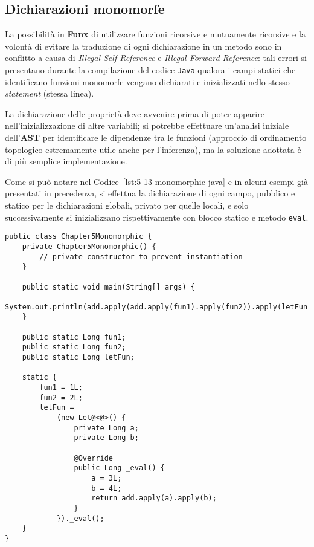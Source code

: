 \subsection{Dichiarazioni monomorfe}
\label{sec:5-13-monomorphic-declarations}

La possibilità in \textbf{Funx} di utilizzare funzioni ricorsive e mutuamente ricorsive
e la volontà di evitare la traduzione di ogni dichiarazione in un metodo sono in conflitto
a causa di \textit{Illegal Self Reference} e \textit{Illegal Forward Reference}:
tali errori si presentano durante la compilazione del codice \texttt{Java}
qualora i campi statici che identificano funzioni monomorfe vengano dichiarati e inizializzati
nello stesso \textit{statement} (stessa linea).


La dichiarazione delle proprietà deve avvenire prima di poter apparire nell'inizializzazione di altre variabili;
si potrebbe effettuare un'analisi iniziale dell'\textbf{AST} per identificare le dipendenze tra le funzioni
(approccio di ordinamento topologico estremamente utile anche per l'inferenza), ma la soluzione adottata
è di più semplice implementazione.


Come si può notare nel Codice~\ref{lst:5-13-monomorphic-java} e in alcuni esempi già presentati in precedenza,
si effettua la dichiarazione di ogni campo, pubblico e statico per le dichiarazioni globali, privato per quelle locali,
e solo successivamente si inizializzano rispettivamente con blocco statico e metodo \texttt{eval}.

\vspace{4mm}
\begin{lstlisting}[caption={Traduzione di funzioni monomorfe}, style=javaCode, label={lst:5-13-monomorphic-java}]
public class Chapter5Monomorphic {
    private Chapter5Monomorphic() {
        // private constructor to prevent instantiation
    }
    
    public static void main(String[] args) {
        System.out.println(add.apply(add.apply(fun1).apply(fun2)).apply(letFun));
    }
    
    public static Long fun1;    
    public static Long fun2;    
    public static Long letFun;
    
    static {
        fun1 = 1L;    
        fun2 = 2L;    
        letFun =
            (new Let@<@>() {
                private Long a;    
                private Long b;
    
                @Override
                public Long _eval() {
                    a = 3L;
                    b = 4L;
                    return add.apply(a).apply(b);
                }
            })._eval();
    }
}
\end{lstlisting}

